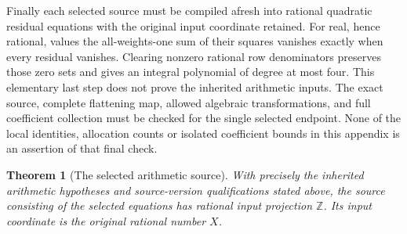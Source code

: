 \documentclass[11pt]{article}
\newtheorem{theorem}{Theorem}[section]
\theoremstyle{definition}
\theoremstyle{remark}
\newcommand{\Z}{\mathbb Z}
\begin{document}
Finally each selected source must be compiled afresh into rational
quadratic residual equations with the original input coordinate retained.
For real, hence rational, values the all-weights-one sum of their squares
vanishes exactly when every residual vanishes. Clearing nonzero rational
row denominators preserves those zero sets and gives an integral polynomial
of degree at most four.
This elementary last step does not prove the inherited arithmetic inputs.
The exact source, complete flattening map, allowed algebraic transformations,
and full coefficient collection must be checked for the single selected
endpoint. None of the local identities, allocation counts or isolated
coefficient bounds in this appendix is an assertion of that final check.
\begin{theorem}[The selected arithmetic source]
\label{thm:quartic-selected-source}
With precisely the inherited arithmetic hypotheses and source-version
qualifications stated above, the source consisting of the selected
equations has rational input projection $\Z$. Its input coordinate is the
original rational number $X$.
\end{theorem}
\end{document}
